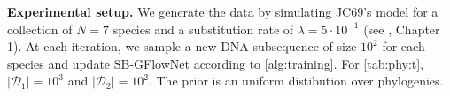 \documentclass{article}
\newcommand{\pp}[1]{\vspace{0pt}\noindent\textbf{#1}}
\theoremstyle{plain}
\theoremstyle{definition}
\theoremstyle{remark}
\theoremstyle{remark}
\begin{document}
\pp{Experimental setup.} We generate the data by simulating JC69's model for a collection of $N = 7$ species and a substitution rate of $\lambda = 5 \cdot 10^{-1}$ (see \cite{Yang2014}, Chapter 1). At each iteration, we sample a new DNA subsequence of size $10^{2}$ for each species and update SB-GFlowNet according to \autoref{alg:training}. For \autoref{tab:phy:t}, $|\mathcal{D}_{1}| = 10^{3}$ and $|\mathcal{D}_{2}| = 10^{2}$. The prior is an uniform distibution over phylogenies. %



\end{document}
